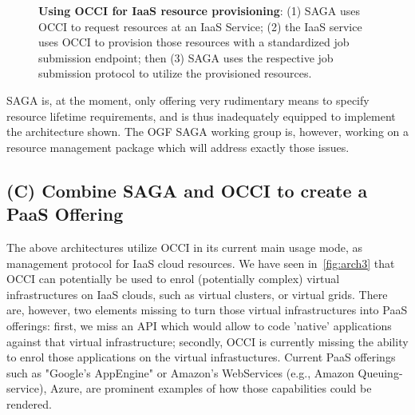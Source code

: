 \documentclass[10pt,conference,final,letterpaper,twoside,twocolumn,]{IEEEtran}
\newcommand{\B}[1]{\textbf{#1}}
\begin{document}
 \begin{figure}[h!]
  \caption{\footnotesize\label{fig:arch2} \B{Using OCCI for IaaS resource provisioning}: 
     (1) SAGA uses OCCI to request resources at an IaaS Service; 
     (2) the IaaS service uses OCCI to provision those resources 
          with a standardized job submission endpoint; then 
     (3) SAGA uses the respective job submission protocol to utilize 
     the provisioned resources.}
 \end{figure}

 SAGA is, at the moment, only offering very rudimentary means to
 specify resource lifetime requirements, and is thus inadequately
 equipped to implement the architecture shown.  The OGF SAGA working
 group is, however, working on a resource management package which
 will address exactly those issues.


 \subsection{(C) Combine SAGA and OCCI to create a PaaS Offering}

 The above architectures utilize OCCI in its current main usage mode,
 as management protocol for IaaS cloud resources.  We have seen
 in~\ref{fig:arch3} that OCCI can potentially be used to enrol
 (potentially complex) virtual infrastructures on IaaS clouds, such as
 virtual clusters, or virtual grids.  There are, however, two elements
 missing to turn those virtual infrastructures into PaaS offerings:
 first, we miss an API which would allow to code 'native' applications
 against that virtual infrastructure; secondly, OCCI is currently
 missing the ability to enrol those applications on the virtual
 infrastuctures.  Current PaaS offerings such as "Google's AppEngine"
 or Amazon's WebServices (e.g., Amazon Queuing-service), Azure, are
 prominent examples of how those capabilities could be rendered.
\end{document}
